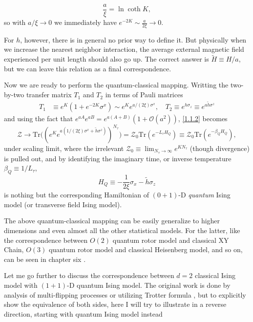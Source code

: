 \documentclass[10pt,nofootinbib]{revtex4}
\def\Z{\mathcal{Z}}
\numberwithin{equation}{section}
\begin{document}
		\begin{equation}\label{1.1.3}
			\dfrac{a}{\xi}=\ln\coth K,
		\end{equation}
		so with $a/\xi\rightarrow0$ we immediately have $e^{-2K}\sim\frac{a}{2\xi}\rightarrow0.$\par
		For $h$, however, there is in general no prior way to define it. But physically when we increase the nearest neighbor interaction, the average external magnetic field experienced per unit length should also go up. The correct answer is $\widetilde{H}\equiv H/a$, but we can leave this relation as a final correspondence.\par
		Now we are ready to perform the quantum-classical mapping. Writting the two-by-two transfer matrix $T_1$ and $T_2$ in terms of Pauli matrices
		\begin{align}
			T_1&\equiv e^K(1+e^{-2K}\sigma^x)\sim e^K e^{a/(2\xi)\sigma^x},\quad T_2\equiv e^{h\sigma_z}\equiv e^{a\widetilde{h}\sigma^z}
		\end{align}
		and using the fact that $e^{aA}e^{aB}=e^{a(A+B)}(1+\mathcal{O}(a^2))$, \eqref{1.1.2} becomes
		\begin{equation*}
			\Z\rightarrow\mathrm{Tr}\bigg((e^Ke^{a(1/(2\xi)\sigma^x+\widetilde{h}\sigma^z )})^{N_\tau}\bigg)=\Z_0\mathrm{Tr}(e^{-L_\tau H_Q})\equiv\Z_0\mathrm{Tr}(e^{-\beta_Q H_Q}),
		\end{equation*}
		under scaling limit, where the irrelevant $\displaystyle\Z_0\equiv\lim_{N_\tau\rightarrow\infty}e^{KN_\tau}$ (though divergence) is pulled out, and by identifying the imaginary time, or inverse temperature $\beta_Q\equiv 1/L_\tau$,
		\begin{equation}\label{1.1.5}
			H_Q\equiv-\dfrac{1}{2\xi}\sigma_x- \widetilde{h}\sigma_z 
		\end{equation}
		is nothing but the corresponding Hamiltonian of $(0+1)$-D \emph{quantum} Ising model (or transverse field Ising model).\par
		The above quantum-classical mapping can be easily generalize to higher dimensions and even almost all the other statistical models. For the latter, like the correspondence between $O(2)$ quantum rotor model and classical XY Chain, $O(3)$ quantum rotor model and classical Heisenberg model, and so on, can be seen in chapter six \cite{sachdev2011quantum}.\par
		Let me go further to discuss the correspondence between $d=2$ classical Ising model with $(1+1)$-D quantum Ising model. The original work is done by analysis of multi-flipping processes \cite{fradkin1978order,kogut1979introduction} or utilizing Trotter formula \cite{suzuki1976relationship}, but to explicitly show the equivalence of both sides, here I will try to illustrate in a reverse direction, starting with quantum Ising model instead
\end{document}

